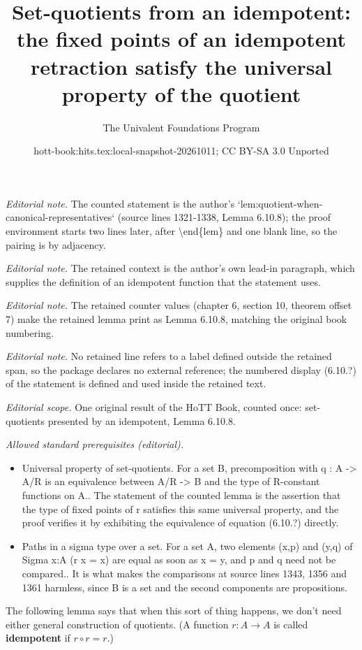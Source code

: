\documentclass[10pt,a4paper]{article}
\title{Set-quotients from an idempotent: the fixed points of an idempotent retraction satisfy the universal property of the quotient}
\author{The Univalent Foundations Program}
\date{hott-book:hits.tex:local-snapshot-20261011; CC BY-SA 3.0 Unported}
\newcounter{chapter}
\providecommand{\index}[1]{}
\newcommand{\define}[1]{\textbf{#1}}
\theoremstyle{definition}
\theoremstyle{remark}
\numberwithin{equation}{section}
\newcommand{\indexdef}[1]{\index{#1|defstyle}}   %
\begin{document}
\maketitle
\setcounter{chapter}{6}
\setcounter{section}{10}
\setcounter{thm}{7}
\noindent\textit{Editorial note.} The counted statement is the author's `lem:quotient-when-canonical-representatives` (source lines 1321-1338, Lemma 6.10.8); the proof environment starts two lines later, after \textbackslash{}end\{lem\} and one blank line, so the pairing is by adjacency.\par\medskip
\noindent\textit{Editorial note.} The retained context is the author's own lead-in paragraph, which supplies the definition of an idempotent function that the statement uses.\par\medskip
\noindent\textit{Editorial note.} The retained counter values (chapter 6, section 10, theorem offset 7) make the retained lemma print as Lemma 6.10.8, matching the original book numbering.\par\medskip
\noindent\textit{Editorial note.} No retained line refers to a label defined outside the retained span, so the package declares no external reference; the numbered display (6.10.?) of the statement is defined and used inside the retained text.\par\medskip
\noindent\textit{Editorial scope.} One original result of the HoTT Book, counted once: set-quotients presented by an idempotent, Lemma 6.10.8.\par\medskip
\noindent\textit{Allowed standard prerequisites (editorial).}\begin{itemize}
\item Universal property of set-quotients. For a set B, precomposition with q : A -> A/R is an equivalence between A/R -> B and the type of R-constant functions on A.. The statement of the counted lemma is the assertion that the type of fixed points of r satisfies this same universal property, and the proof verifies it by exhibiting the equivalence of equation (6.10.?) directly.
\item Paths in a sigma type over a set. For a set A, two elements (x,p) and (y,q) of Sigma x:A (r x = x) are equal as soon as x = y, and p and q need not be compared.. It is what makes the comparisons at source lines 1343, 1356 and 1361 harmless, since B is a set and the second components are propositions.
\end{itemize}\medskip
The following lemma says that when this sort of thing happens, we don't need either general construction of quotients.
(A function $r:A\to A$ is called \define{idempotent}
\indexdef{function!idempotent}%
\indexdef{idempotent!function}%
if $r\circ r = r$.)
\end{document}
